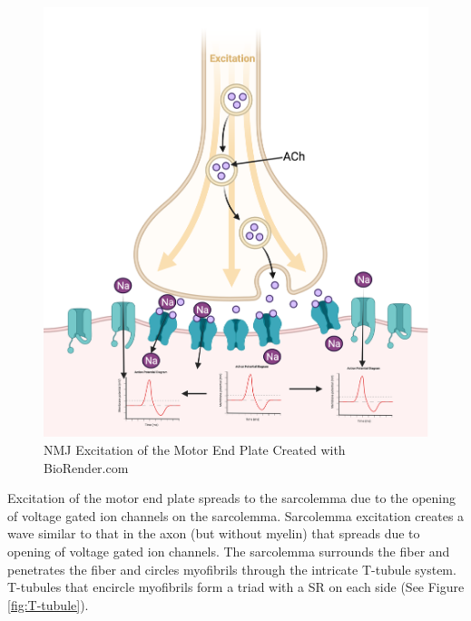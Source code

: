 \begin{figure}[!ht]
    \centering
    \includegraphics[width=1\linewidth]{./figure/NMJ.png}
    \caption{NMJ Excitation of the Motor End Plate \footnotesize{Created with BioRender.com}}
    \label{fig:NMJ}
\end{figure}

Excitation of the motor end plate spreads to the sarcolemma due to the opening of voltage gated ion channels on the sarcolemma. Sarcolemma excitation creates a wave similar to that in the axon (but without myelin) that spreads due to opening of voltage gated ion channels. The sarcolemma surrounds the fiber and penetrates the fiber and circles myofibrils through the intricate T-tubule system. T-tubules that encircle myofibrils form a triad with a SR on each side (See Figure \ref{fig:T-tubule}).


